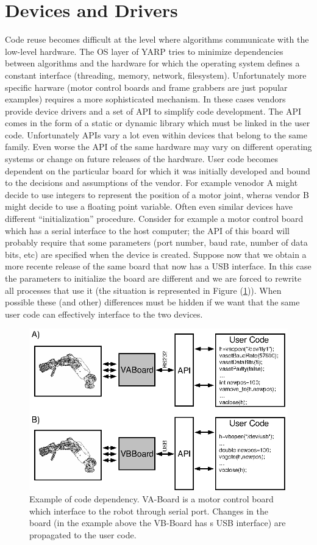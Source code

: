 \section{Devices and Drivers}
Code reuse becomes difficult at the level where algorithms 
communicate with the low-level hardware. The OS layer of YARP tries 
to minimize dependencies between algorithms and the hardware for 
which the operating system defines a constant interface (threading, 
memory, network, filesystem). Unfortunately more specific harware 
(motor control boards and frame grabbers are just popular 
examples) requires a more sophisticated mechanism. In these 
cases vendors provide device drivers and a set of API to simplify 
code development. The API comes in the form of a static or dynamic 
library which must be linked in the user code. Unfortunately
APIs vary a lot even within devices that belong to the same family. 
Even worse the API of the same hardware may vary on different 
operating systems or change on future releases of the hardware. User 
code becomes dependent on the particular board for which it was initially 
developed and bound to the decisions and assumptions of the vendor. For 
example venodor A might decide to use integers to represent the position 
of a motor joint, wheras vendor B might decide to use a floating point
variable. Often even similar devices have different ``initialization'' 
procedure. Consider for example a motor control board which has a serial
interface to the host computer; the API of this board will probably require 
that some parameters (port number, baud rate, number of data bits, etc) are 
specified when the device is created. Suppose now that we obtain a more 
recente release of the same board that now has a USB interface. In this 
case the parameters to initialize the board are different and we are forced 
to rewrite all processes that use it (the situation is 
represented in Figure (\ref{fig:devices1})). When possible these (and other) 
differences must be hidden if we want that the same user code can 
effectively interface to the two devices.

\begin{figure}[tbp]
\centerline{
\includegraphics[width=24cm]{fig-devices1}
}
\caption{Example of code dependency. VA-Board is a 
motor control board which interface to the robot through serial port. 
Changes in the board (in the example above the VB-Board has s USB 
interface) are propagated to the user code.}\label{fig:devices1}
\end{figure}

